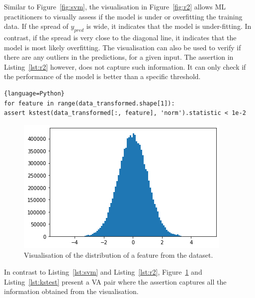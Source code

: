 \documentclass[conference]{IEEEtran}
\begin{document}
Similar to Figure~\ref{fig:svm}, the visualisation in Figure~\ref{fig:r2} allows ML practitioners to visually assess if the model is under or overfitting the training data. If the spread of $y_{pred}$ is wide, it indicates that the model is under-fitting. In contrast, if the spread is very close to the diagonal line, it indicates that the model is most likely overfitting. The visualisation can also be used to verify if there are any outliers in the predictions, for a given input. The assertion in Listing~\ref{lst:r2} however, does not capture such information. It can only check if the performance of the model is better than a specific threshold.

\begin{lstlisting}[caption={Assertion to check that each feature in a dataset is normal. The distribution of each feature is compared to that of a normal distribution using the Kolmogorov-Smirnov test for goodness of fit from the scipy library.}, label={lst:kstest}]{language=Python}
for feature in range(data_transformed.shape[1]):
assert kstest(data_transformed[:, feature], 'norm').statistic < 1e-2
\end{lstlisting}

\begin{figure}
  \includegraphics[width=\linewidth]{../catalogue/select-152a.png}
  \caption{Visualisation of the distribution of a feature from the dataset.}\label{fig:kstest}
\end{figure}

In contrast to Listing~\ref{lst:svm} and Listing~\ref{lst:r2}, Figure~\ref{fig:kstest} and Listing~\ref{lst:kstest} present a VA pair where the assertion captures all the information obtained from the visualisation.
\end{document}

